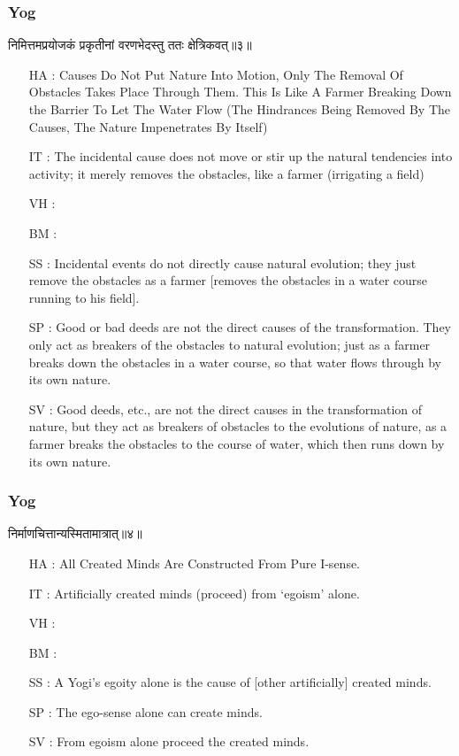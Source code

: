 \begin{frame}[fragile]\frametitle{Yog}
\begin{sanskrit}
निमित्तमप्रयोजकं प्रकृतीनां वरणभेदस्तु ततः क्षेत्रिकवत्॥३॥
\end{sanskrit}

	\begin{itemize}
	\item [HA]: Causes Do Not Put Nature Into Motion, Only The Removal Of Obstacles Takes Place Through Them. This Is Like A Farmer Breaking Down the Barrier To Let The Water Flow (The Hindrances Being Removed By The Causes, The Nature Impenetrates By Itself)
	\item [IT]: The incidental cause does not move or stir up the natural tendencies into activity; it merely removes the obstacles, like a farmer (irrigating a field)
	\item [VH]: 
	\item [BM]: 
	\item [SS]: Incidental events do not directly cause natural evolution; they just remove the obstacles as a farmer [removes the obstacles in a water course running to his field].
	\item [SP]: Good or bad deeds are not the direct causes of the transformation. They only act as breakers of the obstacles to natural evolution; just as a farmer breaks down the obstacles in a water course, so that water flows through by its own nature.
	\item [SV]: Good deeds, etc., are not the direct causes in the transformation of nature, but they act as breakers of obstacles to the evolutions of nature, as a farmer breaks the obstacles to the course of water, which then runs down by its own nature.
	\end{itemize}
\end{frame}



\begin{frame}[fragile]\frametitle{Yog}
\begin{sanskrit}
निर्माणचित्तान्यस्मितामात्रात्॥४॥
\end{sanskrit}

	\begin{itemize}
	\item [HA]: All Created Minds Are Constructed From Pure I-sense.
	\item [IT]: Artificially created minds (proceed) from ‘egoism’ alone.
	\item [VH]: 
	\item [BM]: 
	\item [SS]: A Yogi’s egoity alone is the cause of [other artificially] created minds.
	\item [SP]: The ego-sense alone can create minds.
	\item [SV]: From egoism alone proceed the created minds. 
	\end{itemize}
\end{frame}


